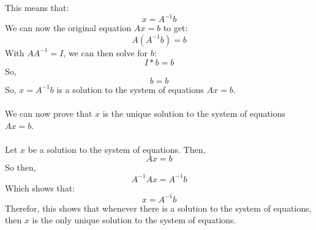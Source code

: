 \documentclass{article}
\begin{document}
This means that:
\begin{equation}
    x = A^{-1}b
\end{equation}
We can now the original equation $Ax = b$ to get:
\begin{equation}
    A(A^{-1}b) = b
\end{equation}
With $AA^{-1} = I$, we can then solve for $b$:
\begin{equation}
    I * b = b
\end{equation}
So, 
\begin{equation}
    b = b
\end{equation}
So, $x = A^{-1}b$ is a solution to the system of equations $Ax = b$.
\\\\
We can now prove that $x$ is the unique solution to the system of equations $Ax = b$.
\\\\
Let $x$ be a solution to the system of equations. Then,
\begin{equation}
    Ax = b
\end{equation}
So then,
\begin{equation}
    A^{-1}Ax = A^{-1}b
\end{equation}
Which shows that:
\begin{equation}
    x = A^{-1}b
\end{equation}
Therefor, this shows that whenever there is a solution to the system of equations, then $x$ is the only unique solution to the system of equations.
\end{document}
